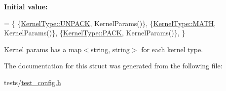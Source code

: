 {\bfseries Initial value\+:}
\begin{DoxyCode}
= \{
      \{\hyperlink{namespacetests_a4f360b8af533762256ff97513bfd6a0daba3bbf795bfdbe156772d8f44833a3af}{KernelType::UNPACK}, KernelParams()\},
      \{\hyperlink{namespacetests_a4f360b8af533762256ff97513bfd6a0da7b849aa2899a63a2da359bf9a0b5b0af}{KernelType::MATH}, KernelParams()\},
      \{\hyperlink{namespacetests_a4f360b8af533762256ff97513bfd6a0daa484d944b59301977fbe221d69d58857}{KernelType::PACK}, KernelParams()\},
  \}
\end{DoxyCode}


Kernel params has a map$<$string, string$>$ for each kernel type. 



The documentation for this struct was generated from the following file\+:\begin{DoxyCompactItemize}
\item 
tests/\hyperlink{test__config_8h}{test\+\_\+config.\+h}\end{DoxyCompactItemize}
